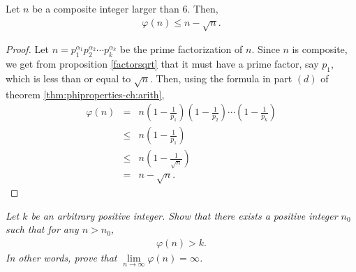 \documentclass[12pt]{subfile}
\begin{document}
		\begin{theorem}
			Let $n$ be a composite integer larger than $6$. Then,
				\begin{align*}
				 \varphi(n) \leq n - \sqrt n.
				\end{align*}
		\end{theorem}

		\begin{proof}
			Let $n= p_1^{\alpha_1} p_2^{\alpha_2} \cdots p_k^{\alpha_k}$ be the prime factorization of $n$. Since $n$ is composite, we get from proposition \ref{factorsqrt} that it must have a prime factor, say $p_1$, which is less than or equal to $\sqrt n$. Then, using the formula in part $(d)$ of theorem \ref{thm:phiproperties-ch:arith},
				\begin{eqnarray*}
					\varphi(n) &=& n \left( 1 - \frac{1}{p_1} \right)  \left( 1 - \frac{1}{p_2} \right)  \cdots \left( 1 - \frac{1}{p_k} \right)  \\
							   &\leq& n \left( 1 - \frac{1}{p_1} \right)\\
							   &\leq& n \left( 1 - \frac{1}{\sqrt n} \right)\\
							   &=& n - \sqrt n.
				\end{eqnarray*}
		\end{proof}

		\begin{theorem}\slshape
			Let $k$ be an arbitrary positive integer. Show that there exists a positive integer $n_0$ such that for any $n>n_0$,
				\begin{align*}
						\varphi(n) > k.
				\end{align*}
			In other words, prove that $\lim\limits_{n \to \infty} \varphi(n)= \infty$.
		\end{theorem}
\end{document}

